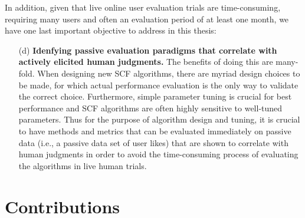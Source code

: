 In addition, given that live online user evaluation trials are
time-consuming, requiring many users and often an evaluation period of
at least one month, we have one last important objective to address in
this thesis:
\begin{enumerate}
\item[(d)] {\bf Idenfying passive evaluation paradigms that correlate
with actively elicited human judgments.}  The benefits of doing this
are many-fold.  When designing new SCF algorithms, there are myriad
design choices to be made, for which actual performance evaluation is
the only way to validate the correct choice.  Furthermore, simple
parameter tuning is crucial for best performance and SCF algorithms
are often highly sensitive to well-tuned parameters.  Thus for the
purpose of algorithm design and tuning, it is crucial to have methods
and metrics that can be evaluated immediately on passive data (i.e., a
passive data set of user likes) that are shown to correlate with human
judgments in order to avoid the time-consuming process of evaluating
the algorithms in live human trials.
\end{enumerate}


\section{Contributions}

\label{sec:Contributions}

